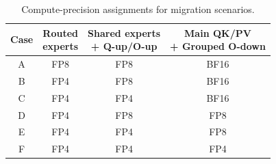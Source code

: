 \begin{table}[t]
\centering
\caption{Compute-precision assignments for migration scenarios.}
\label{tab:case_migrations}
\begingroup\footnotesize\setlength{\tabcolsep}{4pt}
\begin{tabular}{@{}cccc@{}}\toprule
Case & \shortstack{Routed\\experts} & \shortstack{Shared experts\\+ Q-up/O-up} & \shortstack{Main QK/PV\\+ Grouped O-down} \\\midrule
A & FP8 & FP8 & BF16 \\
B & FP4 & FP8 & BF16 \\
C & FP4 & FP4 & BF16 \\
D & FP4 & FP8 & FP8 \\
E & FP4 & FP4 & FP8 \\
F & FP4 & FP4 & FP4 \\\bottomrule
\end{tabular}
\endgroup
\end{table}
